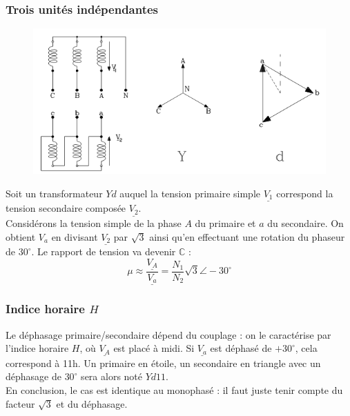 		\subsubsection{Trois unités indépendantes}
		\begin{figure}
		\vspace{-8mm}
		\includegraphics[scale=0.45]{ch3/imager6.png}
		\end{figure}			
		Soit un transformateur $Yd$ auquel la tension primaire simple $\underline{V_1}$ 
		correspond la tension secondaire composée $\underline{V_2}$.\\

				Considérons la tension simple de la phase $A$ du primaire et $a$ du secondaire. 
		On obtient $V_a$ en divisant $\underline{V_2}$ par $\sqrt{3}$ ainsi qu'en 
		effectuant une rotation du phaseur de $30^\circ$. Le rapport de tension va 
		devenir $\mathbb{C}$ :
		\begin{equation}
		\mu \approx \dfrac{\underline{V_A}}{\underline{V_a}} = \dfrac{N_1}{N_2}\sqrt{3}
		\angle-30^\circ
		\end{equation}
	
		\subsubsection{Indice horaire $H$}
		Le déphasage primaire/secondaire dépend du couplage : on le caractérise par 
		l'indice horaire $H$, où $\underline{V_A}$ est placé à midi. Si $\underline{V_a}$ 
		est déphasé de $+30^\circ$, cela correspond à 11h. Un primaire en étoile, 
		un secondaire en triangle avec un déphasage de $30^\circ$ sera alors noté
		$Yd11$.\\
		
		En conclusion, le cas est identique au monophasé : il faut juste tenir compte 
		du facteur $\sqrt{3}$ et du déphasage.
	
	
	
	
	
	
	
	
	
	
	
	
	
	
	
	
	
	
	
	
	
	
